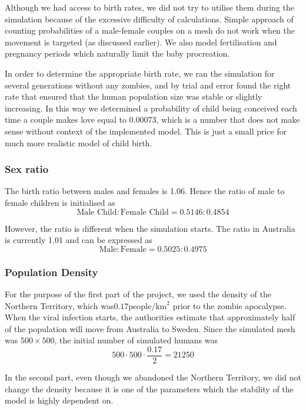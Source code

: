 \documentclass[a4paper]{article}
\begin{document}
Although we had access to birth rates, we did not try to utilise them during the simulation because of the excessive difficulty of calculations.
Simple approach of counting probabilities of a male-female couples on a mesh do not work when the movement is targeted (as discussed earlier).
We also model fertilisation and pregnancy periods which naturally limit the baby procreation.

In order to determine the appropriate birth rate, we ran the simulation for several generations without any zombies, and by trial and error found the right rate that ensured that the human population size was stable or slightly increasing.
In this way we determined a probability of child being conceived each time a couple makes love equal to 0.00073, which is a number that does not make sense without context of the implemented model.
This is just a small price for much more realistic model of child birth.

\subsubsection{Sex ratio}

The birth ratio between males and females is 1.06. \cite{cia}
Hence the ratio of male to female children is initialised as
$$ \text{Male Child} : \text{Female Child} = 0.5146 : 0.4854 $$

However, the ratio is different when the simulation starts.
The ratio in Australia is currently 1.01 and can be expressed as \cite{cia}
$$ \text{Male} : \text{Female} = 0.5025 : 0.4975 $$

\subsubsection{Population Density}

For the purpose of the first part of the project, we used the density of the Northern Territory, which was$0.17\text{people}/\text{km}^2$  prior to the zombie apocalypse. \cite{northernterritory}
When the viral infection starts, the authorities estimate that approximately half of the population will move from Australia to Sweden. \cite{project}
Since the simulated mesh was $500 \times 500$, the initial number of simulated humans was
$$ 500 \cdot 500 \cdot \frac{0.17}{2} = 21250 $$

In the second part, even though we abandoned the Northern Territory, we did not change the density because it is one of the parameters which the stability of the model is highly dependent on.
\end{document}

